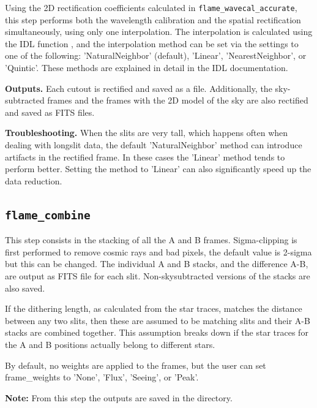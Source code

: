 \documentclass[a4paper]{article}
\begin{document}
\begin{sloppypar}
Using the 2D rectification coefficients calculated in \texttt{flame\_wavecal\_accurate}, this step performs both the wavelength calibration and the spatial rectification simultaneously, using only one interpolation. The interpolation is calculated using the IDL function , and the interpolation method can be set via the settings to one of the following: 'NaturalNeighbor' (default), 'Linear', 'NearestNeighbor', or 'Quintic'. These methods are explained in detail in the IDL documentation.

\medskip
\noindent
\textbf{Outputs.} Each cutout is rectified and saved as a  file. Additionally, the sky-subtracted frames and the frames with the 2D model of the sky are also rectified and saved as FITS files.

\medskip
\noindent
\textbf{Troubleshooting.} When the slits are very tall, which happens often when dealing with longslit data, the default 'NaturalNeighbor' method can introduce artifacts in the rectified frame. In these cases the 'Linear' method tends to perform better. Setting the method to 'Linear' can also significantly speed up the data reduction.



\subsection{\texttt{flame\_combine}}
\label{sec:combine}

This step consists in the stacking of all the A and B frames. Sigma-clipping is first performed to remove cosmic rays and bad pixels, the default value is 2-sigma but this can be changed. The individual A and B stacks, and the difference A-B, are output as FITS file for each slit. Non-skysubtracted versions of the stacks are also saved.

If the dithering length, as calculated from the star traces, matches the distance between any two slits, then these are assumed to be matching slits and their A-B stacks are combined together. This assumption breaks down if the star traces for the A and B positions actually belong to different stars.

By default, no weights are applied to the frames, but the user can set frame\_weights to 'None', 'Flux', 'Seeing', or 'Peak'.

\medskip
\noindent
\textbf{Note:} From this step the outputs are saved in the  directory.


\end{sloppypar}
\end{document}
